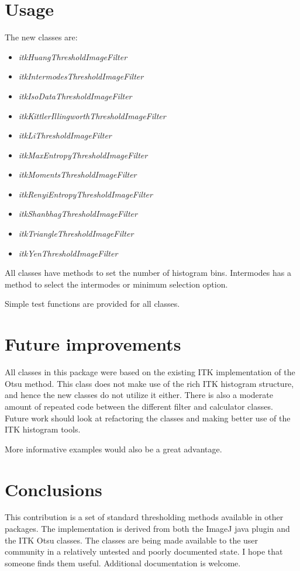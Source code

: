 \documentclass{InsightArticle}
\begin{document}
\section{Usage}
The new classes are:
\begin{itemize}
\item {\em itkHuangThresholdImageFilter}
\item {\em itkIntermodesThresholdImageFilter}
\item {\em itkIsoDataThresholdImageFilter}
\item {\em itkKittlerIllingworthThresholdImageFilter}
\item {\em itkLiThresholdImageFilter}
\item {\em itkMaxEntropyThresholdImageFilter}
\item {\em itkMomentsThresholdImageFilter}
\item {\em itkRenyiEntropyThresholdImageFilter}
\item {\em itkShanbhagThresholdImageFilter}
\item {\em itkTriangleThresholdImageFilter}
\item {\em itkYenThresholdImageFilter}
\end{itemize}
All classes have methods to set the number of histogram
bins. Intermodes has a method to select the intermodes or minimum
selection option.

Simple test functions are provided for all classes. 



\section{Future improvements}
All classes in this package were based on the existing ITK
implementation of the Otsu method. This class does not make use of the
rich ITK histogram structure, and hence the new classes do not utilize
it either. There is also a moderate amount of repeated code between
the different filter and calculator classes. Future work should look
at refactoring the classes and making better use of the ITK histogram
tools.

More informative examples would also be a great advantage.

\section{Conclusions}
This contribution is a set of standard thresholding methods available
in other packages. The implementation is derived from both the ImageJ
java plugin and the ITK Otsu classes. The classes are being made
available to the user community in a relatively untested and poorly
documented state.  I hope that someone finds them useful. Additional
documentation is welcome.

\appendix





\nocite{ITKSoftwareGuide}
\end{document}
